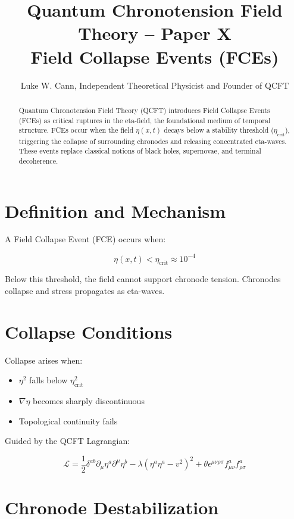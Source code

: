\documentclass[12pt]{article}
\title{Quantum Chronotension Field Theory – Paper X\\Field Collapse Events (FCEs)}
\author{Luke W. Cann, Independent Theoretical Physicist and Founder of QCFT}
\date{}
\begin{document}
\maketitle

\begin{abstract}
Quantum Chronotension Field Theory (QCFT) introduces Field Collapse Events (FCEs) as critical ruptures in the eta-field, the foundational medium of temporal structure. FCEs occur when the field $\eta(x,t)$ decays below a stability threshold ($\eta_{\text{crit}}$), triggering the collapse of surrounding chronodes and releasing concentrated eta-waves. These events replace classical notions of black holes, supernovae, and terminal decoherence. 
\end{abstract}

\section{Definition and Mechanism}

A Field Collapse Event (FCE) occurs when:

\[
\eta(x,t) < \eta_{\text{crit}} \approx 10^{-4}
\]

Below this threshold, the field cannot support chronode tension. Chronodes collapse and stress propagates as eta-waves.

\section{Collapse Conditions}

Collapse arises when:

\begin{itemize}
\item $\eta^2$ falls below $\eta_{\text{crit}}^2$
\item $\nabla \eta$ becomes sharply discontinuous
\item Topological continuity fails
\end{itemize}

Guided by the QCFT Lagrangian:

\[
\mathcal{L} = \frac{1}{2} \delta^{ab} \partial_\mu \eta^a \partial^\mu \eta^b - \lambda(\eta^a \eta^a - v^2)^2 + \theta \epsilon^{\mu\nu\rho\sigma} f^a_{\mu\nu} f^a_{\rho\sigma}
\]

\section{Chronode Destabilization}
\end{document}
